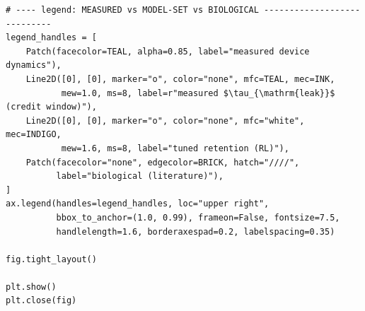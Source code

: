\begin{lstlisting}[caption={schematics.ipynb code cell 10},label={lst:mrl-nb-schematics-10}]
# ---- legend: MEASURED vs MODEL-SET vs BIOLOGICAL ----------------------------
legend_handles = [
    Patch(facecolor=TEAL, alpha=0.85, label="measured device dynamics"),
    Line2D([0], [0], marker="o", color="none", mfc=TEAL, mec=INK,
           mew=1.0, ms=8, label=r"measured $\tau_{\mathrm{leak}}$ (credit window)"),
    Line2D([0], [0], marker="o", color="none", mfc="white", mec=INDIGO,
           mew=1.6, ms=8, label="tuned retention (RL)"),
    Patch(facecolor="none", edgecolor=BRICK, hatch="////",
          label="biological (literature)"),
]
ax.legend(handles=legend_handles, loc="upper right",
          bbox_to_anchor=(1.0, 0.99), frameon=False, fontsize=7.5,
          handlelength=1.6, borderaxespad=0.2, labelspacing=0.35)

fig.tight_layout()

plt.show()
plt.close(fig)
\end{lstlisting}

